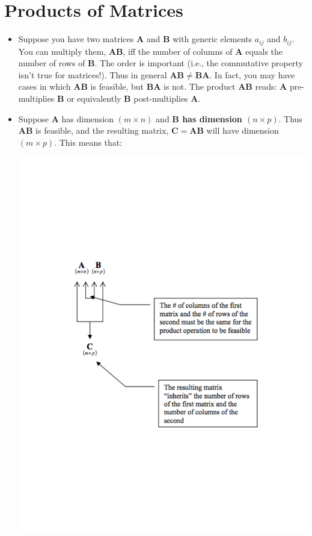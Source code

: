 \documentclass[11pt]{article}
\theoremstyle{definition}
\theoremstyle{remark}
\begin{document}
\section{Products of Matrices}
\begin{itemize}
\item Suppose you have two matrices \textbf{A} and \textbf{B} with generic elements $a_{ij}$ and $b_{ij}$. You can multiply them, $\mathbf{A}\mathbf{B}$, iff the number of columns of \textbf{A} equals the number of rows of \textbf{B}. The order is important (i.e., the commutative property isn't true for matrices!). Thus in general $\mathbf{A}\mathbf{B}\neq\mathbf{B}\mathbf{A}$. In fact, you may have cases in which $\mathbf{A}\mathbf{B}$ is feasible, but $\mathbf{B}\mathbf{A}$ is not. The product $\mathbf{A}\mathbf{B}$ reads: \textbf{A} pre-multiplies \textbf{B} or equivalently \textbf{B} post-multiplies \textbf{A}.
\item Suppose \textbf{A} has dimension $(m \times n)$ and \textbf{B has dimension $(n \times p)$}. Thus $\mathbf{AB}$ is feasible, and the resulting matrix, $\mathbf{C}=\mathbf{AB}$ will have dimension $(m \times p)$. This means that:


\includegraphics[scale = 0.75, trim = -150 0 0 0]{img/matrix_diagram.pdf}


\end{itemize}
\end{document}
